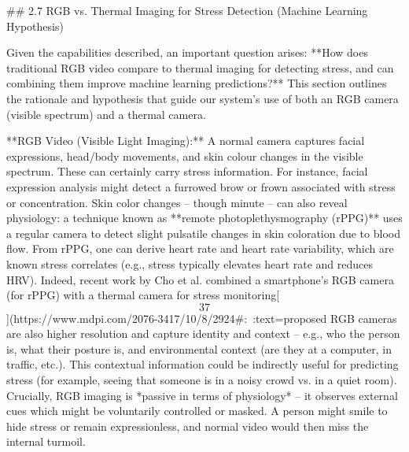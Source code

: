 \documentclass[12pt,a4paper]{article}
\begin{document}
## 2.7 RGB vs. Thermal Imaging for Stress Detection (Machine Learning Hypothesis)

Given the capabilities described, an important question arises: **How
does traditional RGB video compare to thermal imaging for detecting
stress, and can combining them improve machine learning predictions?**
This section outlines the rationale and hypothesis that guide our
system's use of both an RGB camera (visible spectrum) and a thermal
camera.

**RGB Video (Visible Light Imaging):** A normal camera captures facial
expressions, head/body movements, and skin colour changes in the visible
spectrum. These can certainly carry stress information. For instance,
facial expression analysis might detect a furrowed brow or frown
associated with stress or concentration. Skin color changes -- though
minute -- can also reveal physiology: a technique known as **remote
photoplethysmography (rPPG)** uses a regular camera to detect slight
pulsatile changes in skin coloration due to blood flow. From rPPG, one
can derive heart rate and heart rate variability, which are known stress
correlates (e.g., stress typically elevates heart rate and reduces HRV).
Indeed, recent work by Cho et al. combined a smartphone's RGB camera
(for rPPG) with a thermal camera for stress
monitoring[\[37\]](https://www.mdpi.com/2076-3417/10/8/2924#:~:text=proposed%
RGB cameras are also higher resolution and capture identity and context
-- e.g., who the person is, what their posture is, and environmental
context (are they at a computer, in traffic, etc.). This contextual
information could be indirectly useful for predicting stress (for
example, seeing that someone is in a noisy crowd vs. in a quiet room).
Crucially, RGB imaging is *passive in terms of physiology* -- it
observes external cues which might be voluntarily controlled or masked.
A person might smile to hide stress or remain expressionless, and normal
video would then miss the internal turmoil.
\end{document}
